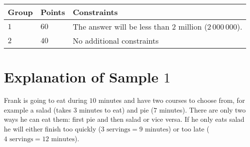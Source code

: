 \noindent
\begin{tabular}{| l | l | p{10cm} |}
\hline
Group & Points & Constraints \\ \hline
$1$    & $60$        & The answer will be less than $2$ million ($2\,000\,000$). \\ \hline 
$2$    & $40$        & No additional constraints \\ \hline
\end{tabular}

\section*{Explanation of Sample $1$}
Frank is going to eat during $10$ minutes and have two courses to choose from, for example a salad (takes $3$ minutes to eat) and pie ($7$ minutes).
There are only two ways he can eat them: first pie and then salad or vice versa.
If he only eats salad he will either finish too quickly ($3 \text{ servings} = 9 \text{ minutes}$) or too late ($4 \text{ servings} = 12 \text{ minutes}$).
